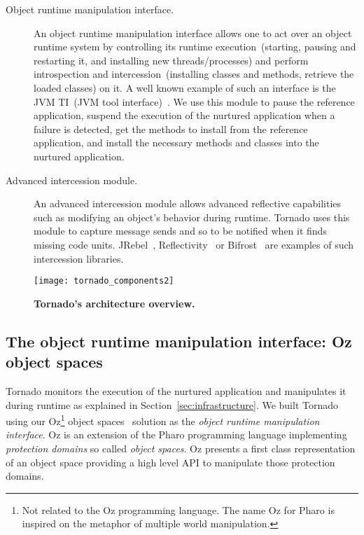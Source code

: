 \begin{description}
\item[Object runtime manipulation interface.] An object runtime manipulation interface allows one to act over an object runtime system by controlling its runtime execution~(\eg starting, pausing and restarting it, and installing new threads/processes) and perform introspection and intercession~(\eg installing classes and methods, retrieve the loaded classes) on it. A well known example of such an interface is the JVM TI~(JVM tool interface)~\cite{JVMTI}.
We use this module to pause the reference application, suspend the execution of the nurtured application when a failure is detected, get the methods to install from the reference application, and install the necessary methods and classes into the nurtured application.

\item[Advanced intercession module.] An advanced intercession module allows advanced reflective capabilities such as modifying an object's behavior during runtime. Tornado uses this module to capture message sends and so to be notified when it finds missing code units. JRebel~\cite{Jreb12a}, Reflectivity~\cite{Denk08a} or Bifrost~\cite{Res12} are examples of such intercession libraries.

\end{description}

\begin{figure}[ht]
\begin{center}
\texttt{[image: tornado\_components2]}
\caption{\small\textbf{Tornado's architecture overview.}\label{fig:tornado_code units}}
\end{center}
\end{figure}


\subsection{The object runtime manipulation interface: Oz object spaces}

Tornado monitors the execution of the nurtured application and manipulates it during runtime as explained in Section~\ref{sec:infrastructure}.
We built Tornado using our Oz\footnote{Not related to the Oz programming language. The name Oz for Pharo is inspired on the metaphor of multiple world manipulation.} object spaces~\cite{Poli13a} solution as the \emph{object runtime manipulation interface}. Oz is an extension of the Pharo programming language implementing \emph{protection domains} so called \emph{object spaces}. Oz presents a first class representation of an object space providing a high level API to manipulate those protection domains.

